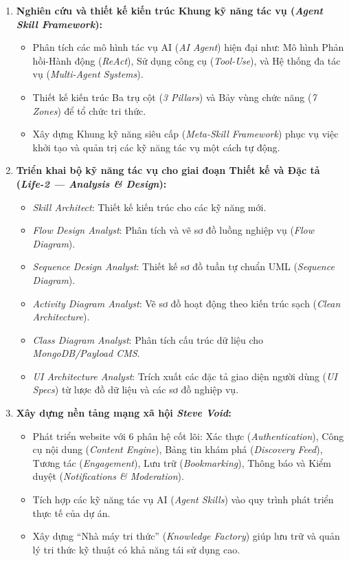 \documentclass[13pt,a4paper,oneside]{extreport}
\numberwithin{equation}{chapter}
\numberwithin{figure}{chapter}
\numberwithin{table}{chapter}
\begin{document}
\begin{enumerate}
    \item \textbf{Nghiên cứu và thiết kế kiến trúc Khung kỹ năng tác vụ (\textit{Agent Skill Framework}):}
    \begin{itemize}
        \item Phân tích các mô hình tác vụ AI (\textit{AI Agent}) hiện đại như: Mô hình Phản hồi-Hành động (\textit{ReAct}), Sử dụng công cụ (\textit{Tool-Use}), và Hệ thống đa tác vụ (\textit{Multi-Agent Systems}).
        \item Thiết kế kiến trúc Ba trụ cột (\textit{3 Pillars}) và Bảy vùng chức năng (\textit{7 Zones}) để tổ chức tri thức.
        \item Xây dựng Khung kỹ năng siêu cấp (\textit{Meta-Skill Framework}) phục vụ việc khởi tạo và quản trị các kỹ năng tác vụ một cách tự động.
    \end{itemize}

    \item \textbf{Triển khai bộ kỹ năng tác vụ cho giai đoạn Thiết kế và Đặc tả (\textit{Life-2 — Analysis \& Design}):}
    \begin{itemize}
        \item \textit{Skill Architect}: Thiết kế kiến trúc cho các kỹ năng mới.
        \item \textit{Flow Design Analyst}: Phân tích và vẽ sơ đồ luồng nghiệp vụ (\textit{Flow Diagram}).
        \item \textit{Sequence Design Analyst}: Thiết kế sơ đồ tuần tự chuẩn UML (\textit{Sequence Diagram}).
        \item \textit{Activity Diagram Analyst}: Vẽ sơ đồ hoạt động theo kiến trúc sạch (\textit{Clean Architecture}).
        \item \textit{Class Diagram Analyst}: Phân tích cấu trúc dữ liệu cho \textit{MongoDB/Payload CMS}.
        \item \textit{UI Architecture Analyst}: Trích xuất các đặc tả giao diện người dùng (\textit{UI Specs}) từ lược đồ dữ liệu và các sơ đồ nghiệp vụ.
    \end{itemize}

    \item \textbf{Xây dựng nền tảng mạng xã hội \textit{Steve Void}:}
    \begin{itemize}
        \item Phát triển website với 6 phân hệ cốt lõi: Xác thực (\textit{Authentication}), Công cụ nội dung (\textit{Content Engine}), Bảng tin khám phá (\textit{Discovery Feed}), Tương tác (\textit{Engagement}), Lưu trữ (\textit{Bookmarking}), Thông báo và Kiểm duyệt (\textit{Notifications \& Moderation}).
        \item Tích hợp các kỹ năng tác vụ AI (\textit{Agent Skills}) vào quy trình phát triển thực tế của dự án.
        \item Xây dựng “Nhà máy tri thức” (\textit{Knowledge Factory}) giúp lưu trữ và quản lý tri thức kỹ thuật có khả năng tái sử dụng cao.
    \end{itemize}


\end{enumerate}
\end{document}
